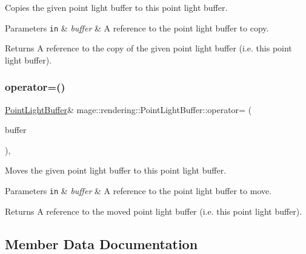 Copies the given point light buffer to this point light buffer.


\begin{DoxyParams}[1]{Parameters}
\mbox{\tt in}  & {\em buffer} & A reference to the point light buffer to copy. \\
\hline
\end{DoxyParams}
\begin{DoxyReturn}{Returns}
A reference to the copy of the given point light buffer (i.\+e. this point light buffer). 
\end{DoxyReturn}
\mbox{\label{structmage_1_1rendering_1_1_point_light_buffer_a8bdda9a12643bc11f03798ed3e6b49f4}} 
\subsubsection{\texorpdfstring{operator=()}{operator=()}\hspace{0.1cm}{\footnotesize\ttfamily [2/2]}}
{\footnotesize\ttfamily \mbox{\hyperlink{structmage_1_1rendering_1_1_point_light_buffer}{Point\+Light\+Buffer}}\& mage\+::rendering\+::\+Point\+Light\+Buffer\+::operator= (\begin{DoxyParamCaption}\item[{\mbox{\hyperlink{structmage_1_1rendering_1_1_point_light_buffer}{Point\+Light\+Buffer}} \&\&}]{buffer }\end{DoxyParamCaption})\hspace{0.3cm}{\ttfamily [default]}, {\ttfamily [noexcept]}}

Moves the given point light buffer to this point light buffer.


\begin{DoxyParams}[1]{Parameters}
\mbox{\tt in}  & {\em buffer} & A reference to the point light buffer to move. \\
\hline
\end{DoxyParams}
\begin{DoxyReturn}{Returns}
A reference to the moved point light buffer (i.\+e. this point light buffer). 
\end{DoxyReturn}


\subsection{Member Data Documentation}
\mbox{\label{structmage_1_1rendering_1_1_point_light_buffer_ad351e938a243a19ce0ba55792d2aed65}} 
